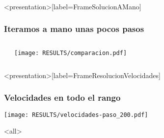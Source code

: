 \begin{frame}<presentation>[label=FrameSolucionAMano]
  \frametitle{Iteramos a mano unas pocos pasos}
  \begin{columns}
    \begin{codeblock}
    \end{codeblock}
    \texttt{[image: RESULTS/comparacion.pdf]}
  \end{columns}

\end{frame}

\begin{frame}<presentation>[label=FrameResolucionVelocidades]
  \frametitle{Velocidades en todo el rango}
\center
  \texttt{[image: RESULTS/velocidades-paso\_200.pdf]}

\end{frame}
\mode<all>
